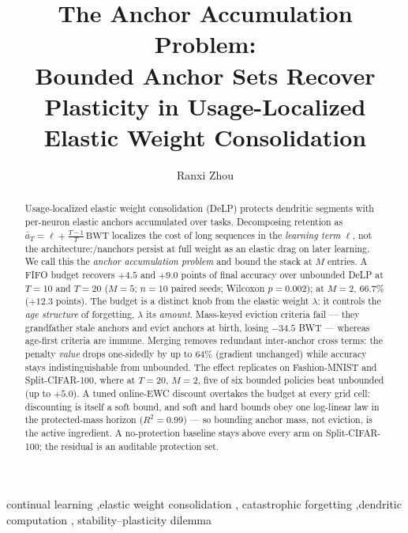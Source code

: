 \documentclass[review,12pt,number]{elsarticle}
\newcommand{\delp}{DeLP}
\begin{document}
\linenumbers

\begin{frontmatter}

\title{The Anchor Accumulation Problem:\\
Bounded Anchor Sets Recover Plasticity in
Usage-Localized Elastic Weight Consolidation}

\author[hnucm]{Ranxi Zhou}
\address[hnucm]{Hunan University of Chinese Medicine, 300 Xueshi Avenue,
Hanpu, Yuelu District, Changsha 410208, Hunan, China}

\begin{abstract}
Usage-localized elastic weight consolidation (\delp{}) protects dendritic
segments with per-neuron elastic anchors accumulated over tasks.
Decomposing retention as
$\bar a_T = \ell + \frac{T-1}{T}\,\mathrm{BWT}$ localizes the cost of long
sequences in the \emph{learning term} $\ell$, not the architecture:/nanchors persist at full weight as an elastic drag on later learning. We call
this the \emph{anchor accumulation problem} and bound the stack at $M$
entries. A FIFO budget recovers $+4.5$ and $+9.0$ points of final accuracy
over unbounded \delp{} at $T{=}10$ and $T{=}20$ ($M{=}5$; $n{=}10$ paired
seeds; Wilcoxon $p=0.002$); at $M{=}2$, $66.7\%$ ($+12.3$ points). The budget
is a distinct knob from the elastic weight $\lambda$: it controls the
\emph{age structure} of forgetting, $\lambda$ its \emph{amount}. Mass-keyed
eviction criteria fail --- they grandfather stale anchors and evict anchors
at birth, losing $-34.5$ BWT --- whereas age-first criteria are immune.
Merging removes redundant inter-anchor cross terms: the penalty \emph{value}
drops one-sidedly by up to $64\%$ (gradient unchanged) while accuracy stays
indistinguishable from unbounded. The effect replicates on Fashion-MNIST and
Split-CIFAR-100, where at $T{=}20$, $M{=}2$, five of six bounded policies
beat unbounded (up to $+5.0$). A tuned online-EWC discount overtakes the
budget at every grid cell: discounting is itself a soft bound, and soft and
hard bounds obey one log-linear law in the protected-mass horizon
($R^2=0.99$) --- so bounding anchor mass, not eviction, is the active
ingredient. A no-protection baseline stays above every arm on
Split-CIFAR-100; the residual is an auditable protection set.
\end{abstract}

\begin{keyword}
continual learning \sep elastic weight consolidation \sep
catastrophic forgetting \sep dendritic computation \sep
stability--plasticity dilemma
\end{keyword}

\end{frontmatter}
\end{document}
